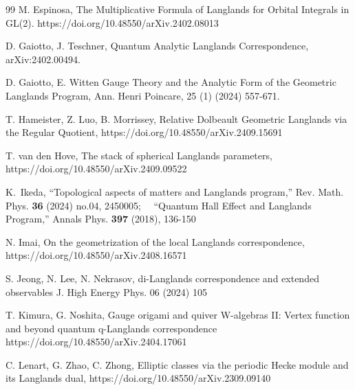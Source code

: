 \documentclass[a4paper]{jpconf}
\begin{document}
\begin{thebibliography}{99}
 M. Espinosa,
The Multiplicative Formula of Langlands for Orbital Integrals in GL(2).
https://doi.org/10.48550/arXiv.2402.08013









 D. Gaiotto, J. Teschner,
Quantum Analytic Langlands Correspondence,
arXiv:2402.00494.


 D.  Gaiotto, E. Witten
Gauge Theory and the Analytic Form of the Geometric Langlands Program,
Ann. Henri Poincare,	
25 (1)  (2024) 557-671.


T. Hameister, Z. Luo, B. Morrissey,
Relative Dolbeault Geometric Langlands via the Regular Quotient,
https://doi.org/10.48550/arXiv.2409.15691





T. van den Hove,
The stack of spherical Langlands parameters,
https://doi.org/10.48550/arXiv.2409.09522





K.~Ikeda, ``Topological aspects of matters and Langlands
program,'' Rev. Math. Phys. \textbf{36} (2024) no.04, 2450005;\ \
 ``Quantum Hall Effect and Langlands Program,'' Annals
Phys. \textbf{397} (2018), 136-150 %


 N. Imai,
On the geometrization of the local Langlands correspondence,
https://doi.org/10.48550/arXiv.2408.16571



 S. Jeong, N.  Lee, N. Nekrasov,
di-Langlands correspondence and extended observables
 J. High Energy Phys. 06 (2024) 105




T. Kimura, G. Noshita,
Gauge origami and quiver W-algebras II: Vertex function and beyond quantum q-Langlands correspondence
https://doi.org/10.48550/arXiv.2404.17061





 C. Lenart, G. Zhao, C.  Zhong,
 Elliptic classes via the periodic Hecke module and its Langlands dual,
https://doi.org/10.48550/arXiv.2309.09140



\end{thebibliography}
\end{document}
